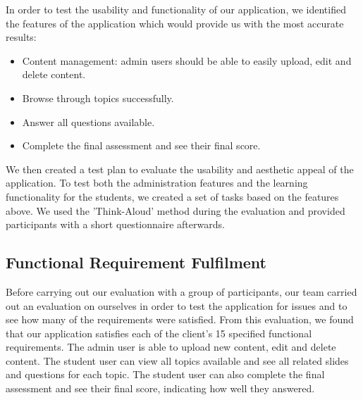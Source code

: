 \documentclass{l3proj}
\begin{document}
In order to test the usability and functionality of our application, we identified the features of the application which would provide us with the most accurate results:

\begin{itemize}
\item Content management: admin users should be able to easily upload, edit and delete content.
\item Browse through topics successfully.
\item Answer all questions available.
\item Complete the final assessment and see their final score. 
\end{itemize}

We then created a test plan to evaluate the usability and aesthetic appeal of the application. To test both the administration features and the learning functionality for the students, we created a set of tasks based on the features above. We used the 'Think-Aloud' method during the evaluation and provided participants with a short questionnaire afterwards.

\subsection{Functional Requirement Fulfilment}

%

Before carrying out our evaluation with a group of participants, our team carried out an evaluation on ourselves in order to test the application for issues and to see how many of the requirements were satisfied. From this evaluation, we found that our application satisfies each of the client's 15 specified functional requirements. The admin user is able to upload new content, edit and delete content. The student user can view all topics available and see all related slides and questions for each topic. The student user can also complete the final assessment and see their final score, indicating how well they answered.
\end{document}
